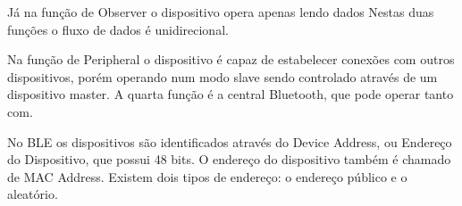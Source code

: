 Já na função de Observer o dispositivo opera apenas lendo dados Nestas duas
funções o fluxo de dados é unidirecional.
    
Na função de Peripheral o dispositivo é capaz de estabelecer conexões com
outros dispositivos, porém operando num modo slave sendo controlado através de
um dispositivo master. A quarta função é a central Bluetooth, que pode operar tanto com.


No BLE os dispositivos são identificados através do Device Address, ou Endereço
do Dispositivo, que possui 48 bits. O endereço do dispositivo também é chamado
de MAC Address. Existem dois tipos de endereço: o endereço público e o
aleatório.













